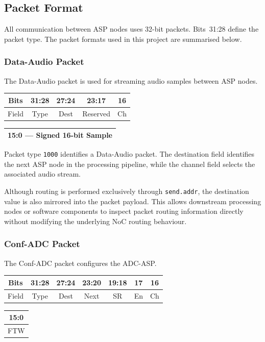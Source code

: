 \documentclass[10pt, a4paper]{article}
\begin{document}
\subsection{Packet Format}

All communication between ASP nodes uses 32-bit packets. Bits~31:28 define the packet type. The packet formats used in this project are summarised below.

\subsubsection*{Data-Audio Packet}

The Data-Audio packet is used for streaming audio samples between ASP nodes.

\begin{center}
\begin{tabular}{|c|c|c|c|c|}
    \hline
    Bits    & 31:28 & 27:24 & 23:17     & 16 \\ \hline
    Field   & Type  & Dest  & Reserved  & Ch \\ \hline
\end{tabular}

\vspace{0.3cm}

\begin{tabular}{|c|}
    \hline
    15:0 --- Signed 16-bit Sample \\ \hline
\end{tabular}
\end{center}

Packet type \texttt{1000} identifies a Data-Audio packet. The destination field identifies the next ASP node in the processing pipeline, while the channel field selects the associated audio stream.

Although routing is performed exclusively through \texttt{send.addr}, the destination value is also mirrored into the packet payload. This allows downstream processing nodes or software components to inspect packet routing information directly without modifying the underlying NoC routing behaviour.

\subsubsection*{Conf-ADC Packet}

The Conf-ADC packet configures the ADC-ASP.

\begin{center}
\begin{tabular}{|c|c|c|c|c|c|c|}
    \hline
    Bits    & 31:28 & 27:24 & 23:20 & 19:18 & 17 & 16 \\ \hline
    Field   & Type  & Dest  & Next  & SR    & En & Ch\\ \hline
\end{tabular}

\vspace{0.3cm}

\begin{tabular}{|c|}
    \hline
    15:0 \\ \hline
    FTW \\ \hline
\end{tabular}
\end{center}
\end{document}
